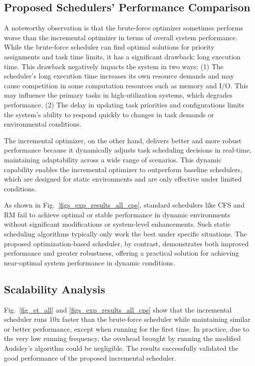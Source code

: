 	
	
	\subsection{Proposed Schedulers' Performance Comparison}
    
    A noteworthy observation is that the brute-force optimizer sometimes performs worse than the incremental optimizer in terms of overall system performance. While the brute-force scheduler can find optimal solutions for priority assignments and task time limits, it has a significant drawback: long execution time. This drawback negatively impacts the system in two ways:
    (1) The scheduler's long execution time increases its own resource demands and may cause competition in some computation resources such as memory and I/O. This may influence the primary tasks in high-utilization systems, which degrades performance.
    (2) The delay in updating task priorities and configurations limits the system's ability to respond quickly to changes in task demands or environmental conditions.
    
    The incremental optimizer, on the other hand, delivers better and more robust performance because it dynamically adjusts task scheduling decisions in real-time, maintaining adaptability across a wide range of scenarios. This dynamic capability enables the incremental optimizer to outperform baseline schedulers, which are designed for static environments and are only effective under limited conditions.

As shown in Fig.~\ref{figs_exp_results_all_cps}, standard schedulers like CFS and RM fail to achieve optimal or stable performance in dynamic environments without significant modifications or system-level enhancements. Such static scheduling algorithms typically only work the best under specific situations.
The proposed optimization-based scheduler, by contrast, demonstrates both improved performance and greater robustness, offering a practical solution for achieving near-optimal system performance in dynamic conditions.
	
	
	
	\subsection{Scalability Analysis}
    
    Fig.~\ref{fig_et_all} and \ref{figs_exp_results_all_cps} show that the incremental scheduler runs 10x faster than the brute-force scheduler while maintaining similar or better performance, except when running for the first time. 
    In practice, due to the very low running frequency, the overhead brought by running the modified Audsley's algorithm could be negligible.
    The results successfully validated the good performance of the proposed incremental scheduler.

